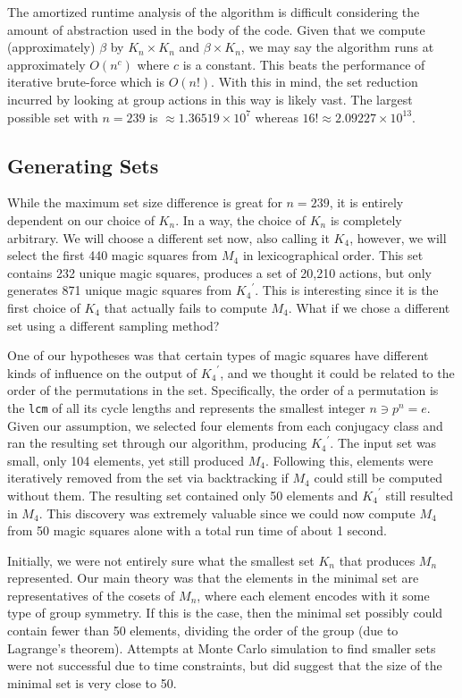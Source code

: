 \documentclass{rhumj_new}
\begin{document}
The amortized runtime analysis of the algorithm is difficult considering the amount of abstraction
used in the body of the code. Given that we compute (approximately) $\beta$ by $K_n \times K_n$ and
$\beta \times K_n$, we may say the algorithm runs at approximately $O\left(n^c\right)$ where $c$ is
a constant. This beats the performance of iterative brute-force which is $O\left(n!\right)$. With
this in mind, the set reduction incurred by looking at group actions in this way is likely vast.
The largest possible set with $n=239$ is $\approx 1.36519 \times 10^7$ whereas $16!\approx 2.09227
  \times 10^{13}$.

\subsection{Generating Sets}

While the maximum set size difference is great for $n=239$, it is entirely dependent on our choice
of $K_n$. In a way, the choice of $K_n$ is completely arbitrary. We will choose a different set
now, also calling it $K_4$, however, we will select the first 440 magic squares from $M_4$ in
lexicographical order. This set contains 232 unique magic squares, produces a set of 20,210
actions, but only generates 871 unique magic squares from ${K_4}^\prime$. This is interesting since
it is the first choice of $K_4$ that actually fails to compute $M_4$. What if we chose a different
set using a different sampling method?

One of our hypotheses was that certain types of magic squares have different kinds of influence on
the output of ${K_4}^\prime$, and we thought it could be related to the order of the permutations
in the set. Specifically, the order of a permutation is the \texttt{lcm} of all its cycle lengths
and represents the smallest integer $n \ni p^n = e$. Given our assumption, we selected four
elements from each conjugacy class and ran the resulting set through our algorithm, producing
${K_4}^\prime$. The input set was small, only 104 elements, yet still produced $M_4$. Following
this, elements were iteratively removed from the set via backtracking if $M_4$ could still be
computed without them. The resulting set contained only 50 elements and ${K_4}^\prime$ still
resulted in $M_4$. This discovery was extremely valuable since we could now compute $M_4$ from 50
magic squares alone with a total run time of about 1 second.

Initially, we were not entirely sure what the smallest set $K_n$ that produces $M_n$ represented.
Our main theory was that the elements in the minimal set are representatives of the cosets of
$M_n$, where each element encodes with it some type of group symmetry. If this is the case, then
the minimal set possibly could contain fewer than 50 elements, dividing the order of the group (due
to Lagrange's theorem). Attempts at Monte Carlo simulation to find smaller sets were not successful
due to time constraints, but did suggest that the size of the minimal set is very close to 50.
\end{document}
